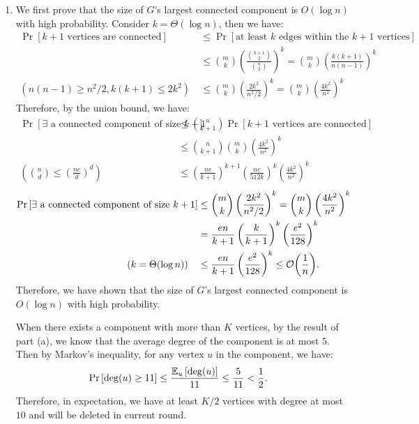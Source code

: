 \begin{answer}
\begin{enumerate}[label=\alph*).]
        \item We first prove that the size of $G$'s largest connected component is $O(\log n)$ with high probability. Consider $k = \Theta(\log n)$, then we have:
        \begin{align*}
            \Pr\left[k+1 \text{ vertices are connected}\right] &\le \Pr\left[\text{at least $k$ edges within the $k+1$ vertices}\right] \\
            &\le \binom{m}{k} \left(\frac{\binom{k+1}{2}}{\binom{n}{2}}\right)^{k} = \binom{m}{k} \left(\frac{k(k+1)}{n(n-1)}\right)^k \\
            (n(n-1)\ge n^2/2, k(k+1) \le 2k^2)~&\le \binom{m}{k} \left(\frac{2k^2}{n^2/2}\right)^k = \binom{m}{k} \left(\frac{4k^2}{n^2}\right)^k
        \end{align*}
        Therefore, by the union bound, we have:
        \begin{align*}
            \Pr\left[\exists\text{ a connected component of size $k+1$}\right] &\le \binom{n}{k+1} \Pr\left[k+1 \text{ vertices are connected}\right] \\
            &\le \binom{n}{k+1} \binom{m}{k} \left(\frac{4k^2}{n^2}\right)^k \\
           \left(\binom{n}{d}\le \left(\frac{ne}{d}\right)^d\right)\quad &\le \left(\frac{ne}{k+1}\right)^{k+1} \left(\frac{ne}{512k}\right)^k \left(\frac{4k^2}{n^2}\right)^k 
        \end{align*}
        \begin{align*}
            \Pr\left[\exists\text{ a connected component of size $k+1$}\right] & \le \binom{m}{k} \left(\frac{2k^2}{n^2/2}\right)^k = \binom{m}{k} \left(\frac{4k^2}{n^2}\right)^k \\
            &= \frac{en}{k+1} \left(\frac{k}{k+1}\right)^k \left(\frac{e^2}{128}\right)^k   \\
            (k = \Theta(\log n))\quad &\le \frac{en}{k+1} \left(\frac{e^2}{128}\right)^k \le \order{\frac{1}{n}}.
        \end{align*}
        Therefore, we have shown that the size of $G$'s largest connected component is $O(\log n)$ with high probability.
        
        When there exists a component with more than $K$ vertices, by the result of part (a), we know that the average degree of the component is at most $5$. 
        Then by Markov's inequality, for any vertex $u$ in the component, we have:
        \begin{align*}
            \Pr\left[\deg(u) \ge 11\right] &\le \frac{\mathbb{E}_u\left[\deg(u)\right]}{11} \le \frac{5}{11} < \frac{1}{2}.
        \end{align*}
        Therefore, in expectation, we have at least $K/2$ vertices with degree at most $10$ and will be deleted in current round. 


\end{enumerate}
\end{answer}
